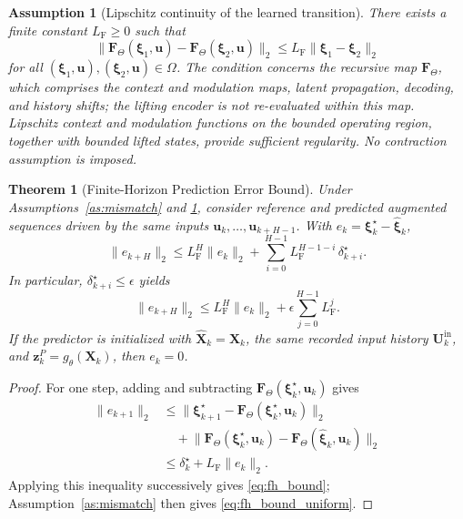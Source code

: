 \documentclass[journal]{IEEEtran}
\newtheorem{assumption}{Assumption}
\newtheorem{theorem}{Theorem}
\newcommand{\vu}{\mathbf{u}}
\newcommand{\vz}{\mathbf{z}}
\newcommand{\mX}{\mathbf{X}}
\newcommand{\mU}{\mathbf{U}}
\newcommand{\vxi}{\boldsymbol{\xi}}
\newcommand{\mF}{\mathbf{F}}
\newcommand{\mLf}{L_{\mathrm{F}}}
\begin{document}
\begin{assumption}[Lipschitz continuity of the learned transition]
\label{as:lipschitz}
There exists a finite constant \(\mLf\ge0\) such that
\begin{equation}
    \|\mF_\Theta(\vxi_1,\vu)-\mF_\Theta(\vxi_2,\vu)\|_2\le \mLf\|\vxi_1-\vxi_2\|_2
    \label{eq:as_lipschitz}
\end{equation}
for all \((\vxi_1,\vu),(\vxi_2,\vu)\in\Omega\). The condition concerns the recursive map \(\mF_\Theta\), which comprises the context and modulation maps, latent propagation, decoding, and history shifts; the lifting encoder is not re-evaluated within this map. Lipschitz context and modulation functions on the bounded operating region, together with bounded lifted states, provide sufficient regularity. No contraction assumption is imposed.
\end{assumption}

\begin{theorem}[Finite-Horizon Prediction Error Bound]
\label{thm:fh}
Under Assumptions~\ref{as:mismatch} and \ref{as:lipschitz}, consider reference and predicted augmented sequences driven by the same inputs \(\vu_k,\ldots,\vu_{k+H-1}\). With \(e_k=\vxi^{\star}_k-\hat{\vxi}_k\),
\begin{equation}
    \|e_{k+H}\|_2 \le \mLf^{H}\|e_k\|_2+\sum_{i=0}^{H-1}\mLf^{H-1-i}\,\delta^{\star}_{k+i}.
    \label{eq:fh_bound}
\end{equation}
In particular, \(\delta^{\star}_{k+i}\le\epsilon\) yields
\begin{equation}
    \|e_{k+H}\|_2 \le \mLf^{H}\|e_k\|_2+\epsilon\sum_{j=0}^{H-1}\mLf^{j}.
    \label{eq:fh_bound_uniform}
\end{equation}
If the predictor is initialized with \(\hat{\mX}_k=\mX_k\), the same recorded input history \(\mU_k^{\mathrm{in}}\), and \(\vz_k^P=g_\theta(\mX_k)\), then \(e_k=0\).
\end{theorem}

\begin{proof}
For one step, adding and subtracting \(\mF_\Theta(\vxi^{\star}_k,\vu_k)\) gives
\begin{align*}
    \|e_{k+1}\|_2
    &\le\big\|\vxi^{\star}_{k+1}-\mF_\Theta(\vxi^{\star}_k,\vu_k)\big\|_2 \\
    &\quad+\big\|\mF_\Theta(\vxi^{\star}_k,\vu_k)-\mF_\Theta(\hat{\vxi}_k,\vu_k)\big\|_2 \\
    &\le\delta^{\star}_k+\mLf\|e_k\|_2.
\end{align*}
Applying this inequality successively gives \eqref{eq:fh_bound}; Assumption~\ref{as:mismatch} then gives \eqref{eq:fh_bound_uniform}.
\end{proof}
\end{document}
